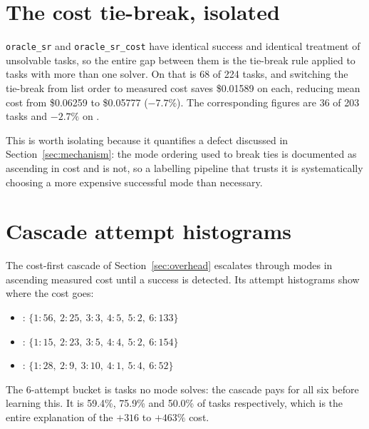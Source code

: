 \FloatBarrier
\section{The cost tie-break, isolated}

\texttt{oracle\_sr} and \texttt{oracle\_sr\_cost} have identical success and
identical treatment of unsolvable tasks, so the entire gap between them is the
tie-break rule applied to tasks with more than one solver. On
 that is 68 of 224 tasks, and switching the tie-break from
list order to measured cost saves \$0.01589 on each, reducing mean cost from
\$0.06259 to \$0.05777 ($-7.7\%$). The corresponding figures are 36 of 203 tasks
and $-2.7\%$ on .

This is worth isolating because it quantifies a defect discussed in
Section~\ref{sec:mechanism}: the mode ordering used to break ties is documented
as ascending in cost and is not, so a labelling pipeline that trusts it is
systematically choosing a more expensive successful mode than necessary.

\FloatBarrier
\section{Cascade attempt histograms}

The cost-first cascade of Section~\ref{sec:overhead} escalates through modes in
ascending measured cost until a success is detected. Its attempt histograms show
where the cost goes:

\begin{itemize}
\item {}: $\{1{:}56,\ 2{:}25,\ 3{:}3,\ 4{:}5,\ 5{:}2,\ 6{:}133\}$
\item {}: $\{1{:}15,\ 2{:}23,\ 3{:}5,\ 4{:}4,\ 5{:}2,\ 6{:}154\}$
\item {}: $\{1{:}28,\ 2{:}9,\ 3{:}10,\ 4{:}1,\ 5{:}4,\ 6{:}52\}$
\end{itemize}

The 6-attempt bucket is tasks no mode solves: the cascade pays for all six
before learning this. It is 59.4\%, 75.9\% and 50.0\% of tasks respectively,
which is the entire explanation of the $+316$ to $+463\%$ cost.
